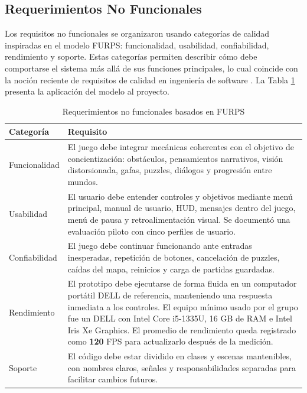 \documentclass[conference]{IEEEtran}
\begin{document}
\subsection{Requerimientos No Funcionales}
Los requisitos no funcionales se organizaron usando categorías de calidad inspiradas en el modelo FURPS: funcionalidad, usabilidad, confiabilidad, rendimiento y soporte. Estas categorías permiten describir cómo debe comportarse el sistema más allá de sus funciones principales, lo cual coincide con la noción reciente de requisitos de calidad en ingeniería de software \cite{olsson2022}. La Tabla \ref{tab:furps} presenta la aplicación del modelo al proyecto.

\begin{table}[t]
\caption{Requerimientos no funcionales basados en FURPS}
\label{tab:furps}
\centering
\begin{tabularx}{\textwidth}{>{\raggedright\arraybackslash}p{2.4cm}X}
\toprule
\textbf{Categoría} & \textbf{Requisito} \\
\midrule
Funcionalidad & El juego debe integrar mecánicas coherentes con el objetivo de concientización: obstáculos, pensamientos narrativos, visión distorsionada, gafas, puzzles, diálogos y progresión entre mundos. \\
Usabilidad & El usuario debe entender controles y objetivos mediante menú principal, manual de usuario, HUD, mensajes dentro del juego, menú de pausa y retroalimentación visual. Se documentó una evaluación piloto con cinco perfiles de usuario. \\
Confiabilidad & El juego debe continuar funcionando ante entradas inesperadas, repetición de botones, cancelación de puzzles, caídas del mapa, reinicios y carga de partidas guardadas. \\
Rendimiento & El prototipo debe ejecutarse de forma fluida en un computador portátil DELL de referencia, manteniendo una respuesta inmediata a los controles. El equipo mínimo usado por el grupo fue un DELL con Intel Core i5-1335U, 16 GB de RAM e Intel Iris Xe Graphics. El promedio de rendimiento queda registrado como \textbf{120} FPS para actualizarlo después de la medición.
\\
Soporte & El código debe estar dividido en clases y escenas mantenibles, con nombres claros, señales y responsabilidades separadas para facilitar cambios futuros. \\
\bottomrule
\end{tabularx}
\end{table}
\end{document}
